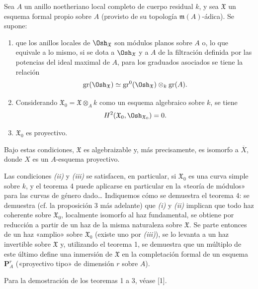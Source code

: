  Sea $A$ un anillo noetheriano local completo de cuerpo
residual $k$, y sea $\mathfrak X$ un esquema formal propio sobre $A$ (provisto
de su topología $\mathfrak m(A)$-ádica). Se supone:
\begin{enumerate}
  \item[\textit{i.}] que los anillos locales de $\Osh_{\mathfrak X}$ son
    módulos planos sobre $A$ o, lo que equivale a lo mismo, si se dota a
    $\Osh_{\mathfrak X}$ y a $A$ de la filtración definida por las potencias del
    ideal maximal de $A$, para los graduados asociados se tiene la relación
    \[
      \operatorname{gr}(\Osh_{\mathfrak X})
      \simeq
      \operatorname{gr}^{0}(\Osh_{\mathfrak X})
      \otimes_k\operatorname{gr}(A).
    \]
  \item[\textit{ii.}] Considerando
    $\mathfrak X_0=\mathfrak X\otimes_A k$ como un esquema algebraico sobre
    $k$, se tiene
    \[
      H^2(\mathfrak X_0,\Osh_{\mathfrak X_0})=0.
    \]
  \item[\textit{iii.}] $\mathfrak X_0$ es proyectivo.
\end{enumerate}
Bajo estas condiciones, $\mathfrak X$ es algebraizable y, más precisamente, es
isomorfo a $\overline X$, donde $X$ es un $A$-esquema proyectivo.

Las condiciones \textit{(ii)} y \textit{(iii)} se satisfacen, en particular,
si $\mathfrak X_0$ es una curva simple sobre $k$, y el teorema 4 puede aplicarse
en particular en la «teoría de módulos» para las curvas de género dado\ldots{}
Indiquemos cómo se demuestra el teorema 4: se demuestra (cf. la proposición 3
más adelante) que \textit{(i)} y \textit{(ii)} implican que todo haz coherente
sobre $\mathfrak X_0$, localmente isomorfo al haz fundamental, se obtiene por
reducción a partir de un haz de la misma naturaleza sobre $\mathfrak X$. Se
parte entonces de un haz «amplio» sobre $\mathfrak X_0$ (existe uno por
\textit{(iii)}), se lo levanta a un haz invertible sobre $\mathfrak X$ y,
utilizando el teorema 1, se demuestra que un múltiplo de este último define una
inmersión de $\mathfrak X$ en la completación formal de un esquema
$\mathbf P_A^r$ («proyectivo tipo» de dimensión $r$ sobre $A$).

Para la demostración de los teoremas 1 a 3, véase [1].


